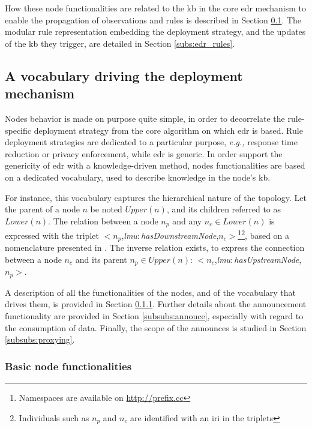 \documentclass{iosart2c}
\newcommand{\namespace}[1]{\textit{#1$:$}}
\newcommand{\concept}[2]{\namespace{#1}\-\textit{#2}}
\newcommand{\triplet}[3]{$<$#1,\textit{#2},#3$>$}
\begin{document}
How these node functionalities are related to the \gls{kb} in the core \gls{edr} mechanism to enable the propagation of observations and rules is described in Section \textsection \ref{subs:edr_vocabulary}.
The modular rule representation embedding the deployment strategy, and the updates of the \gls{kb} they trigger, are detailed in Section \textsection \ref{subs:edr_rules}.

\subsection{A vocabulary driving the deployment mechanism}
\label{subs:edr_vocabulary}

Nodes behavior is made on purpose quite simple, in order to decorrelate the rule-specific deployment strategy from the core algorithm on which \gls{edr} is based.
Rule deployment strategies are dedicated to a particular purpose, \textit{e.g.,} response time reduction or privacy enforcement, while \gls{edr} is generic.%
In order support the genericity of \gls{edr} with a knowledge-driven method, nodes functionalities are based on a dedicated vocabulary, used to describe knowledge in the node's \gls{kb}.

For instance, this vocabulary captures the hierarchical nature of the topology.
Let the parent of a node $n$ be noted $Upper(n)$, and its children referred to as $Lower(n)$.
The relation between a node $n_p$ and any $n_c\in Lower(n)$ is expressed with the triplet \triplet{$n_p$}{\concept{lmu}{has\-Downstream\-Node}}{$n_c$}\footnote{Namespaces are available on \url{http://prefix.cc}}\footnote{Individuals such as $n_p$ and $n_c$ are identified with an \gls{iri} in the triplets}, based on a nomenclature presented in \cite{Seydoux2017}. 
The inverse relation exists, to express the connection between a node $n_c$ and its parent $n_p\in Upper(n)$: \triplet{$n_c$}{\concept{lmu}{has\-Upstream\-Node}}{$n_p$}.

A description of all the functionalities of the nodes, and of the vocabulary that drives them, is provided in Section \textsection \ref{subsubs:basic_functionalities}. 
Further details about the announcement functionality are provided in Section \textsection \ref{subsubs:annouce}, especially with regard to the consumption of data.
Finally, the scope of the announces is studied in Section \textsection \ref{subsubs:proxying}.

\subsubsection{Basic node functionalities}
\label{subsubs:basic_functionalities}
\end{document}
